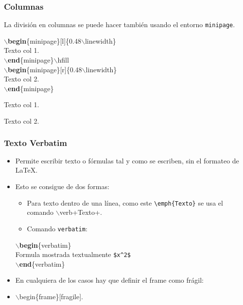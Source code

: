 \documentclass[aspectratio=1610]{beamer}%
\begin{document}
\begin{frame}[fragile]
\frametitle{\textbf{Columnas}}
\justifying
 La división en columnas se puede hacer también usando el entorno \texttt{minipage}.
 
 \begin{minipage}[l]{0.48\linewidth}

$\backslash$\textbf{begin}\{minipage\}[l]\{0.48$\backslash$linewidth\}\\
Texto col 1.\\
$\backslash$\textbf{end}\{minipage\}$\backslash$hfill\\
$\backslash$\textbf{begin}\{minipage\}[r]\{0.48$\backslash$linewidth\}\\
Texto col 2.\\
$\backslash$\textbf{end}\{minipage\}

\end{minipage}\hfill
\begin{minipage}[r]{0.48\linewidth}
 \begin{minipage}[l]{0.48\linewidth}
Texto col 1.
\end{minipage}\hfill
\begin{minipage}[r]{0.48\linewidth}
Texto col 2.
\end{minipage}
\end{minipage}

 
\end{frame}

\begin{frame}[fragile]
\frametitle{\textbf{Texto Verbatim}}
\justifying
 \begin{itemize}\justifying
  \item Permite escribir texto o fórmulas tal y como se escriben, sin el formateo de \LaTeX{}.
  \item Esto se consigue de dos formas:
  \begin{itemize}\justifying
  \item Para texto dentro de una línea, como este \verb+\emph{Texto}+ se usa el comando $\backslash$verb+Texto+.
  \item Comando \texttt{verbatim}:
\end{itemize}
\begin{block}{}
$\backslash$\textbf{begin}\{verbatim\}\\
Formula mostrada textualmente \verb+$x^2$+\\
$\backslash$\textbf{end}\{verbatim\}
\end{block}

\item En cualquiera de los casos hay que definir el frame como frágil:
\item []$\backslash$begin\{frame\}[fragile].
\end{itemize}

\end{frame}
\end{document}
